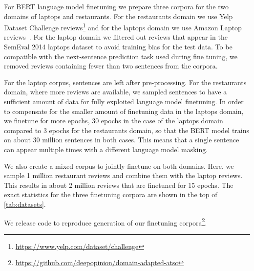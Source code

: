 \documentclass[11pt,a4paper]{article}
\begin{document}
For BERT language model finetuning we prepare three corpora for the
two domains of laptops and restaurants. For the restaurants domain we
use Yelp Dataset Challenge
reviews\footnote{\url{https://www.yelp.com/dataset/challenge}} and
for the laptops domain we use Amazon Laptop reviews~\cite{He2016}. For
the laptop domain we filtered out reviews that appear in the
SemEval 2014 laptops dataset to avoid training bias for the test data.
To be compatible with the next-sentence prediction task used during
fine tuning, we removed reviews containing fewer than two sentences from the corpora.

For the laptop corpus,  sentences are left after pre-processing.
For the restaurants domain, where more reviews are available, we sampled 
sentences to have a sufficient amount of data for fully exploited language model finetuning.
In order to compensate for the smaller amount of finetuning data in the laptops domain, we finetune for more epochs, 30 epochs in the case of the laptops domain compared to 3 epochs for the restaurants domain, so that the BERT model trains on about 30 million sentences in both cases. This means that a single sentence can appear multiple times with a different language model masking.


We also create a mixed corpus to jointly finetune on both domains. Here, we sample 1 million restaurant reviews and combine them with the laptop reviews. This results in about 2 million reviews that are finetuned for 15 epochs.
The exact statistics for the three finetuning corpora are shown in the top of \autoref{tab:datasets}.

We release code to reproduce generation of our finetuning corpora\footnote{\url{https://github.com/deepopinion/domain-adapted-atsc}}.
\end{document}
